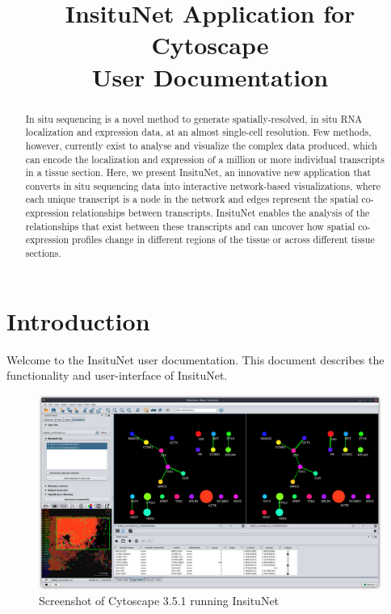\documentclass[a4paper,12pt]{article}
\title{InsituNet Application for Cytoscape \\ \large User Documentation}
\begin{document}
\maketitle
\begin{abstract}
In situ sequencing is a novel method to generate spatially-resolved, in situ RNA localization and expression data, at an almost single-cell resolution. Few methods, however, currently exist to analyse and visualize the complex data produced, which can encode the localization and expression of a million or more individual transcripts in a tissue section. Here, we present InsituNet, an innovative new application that converts in situ sequencing data into interactive network-based visualizations, where each unique transcript is a node in the network and edges represent the spatial co-expression relationships between transcripts. InsituNet enables the analysis of the relationships that exist between these transcripts and can uncover how spatial co-expression profiles change in different regions of the tissue or across different tissue sections. 
\end{abstract}
\clearpage

\tableofcontents

\clearpage

\section{Introduction}
Welcome to the InsituNet user documentation. This document describes the functionality and user-interface of InsituNet.

\begin{figure}[htb]
	\caption{Screenshot of Cytoscape 3.5.1 running InsituNet}\label{fig:shot}
	\centering
	\includegraphics[width=\textwidth]{shot_1-shadow}
\end{figure}
\end{document}
